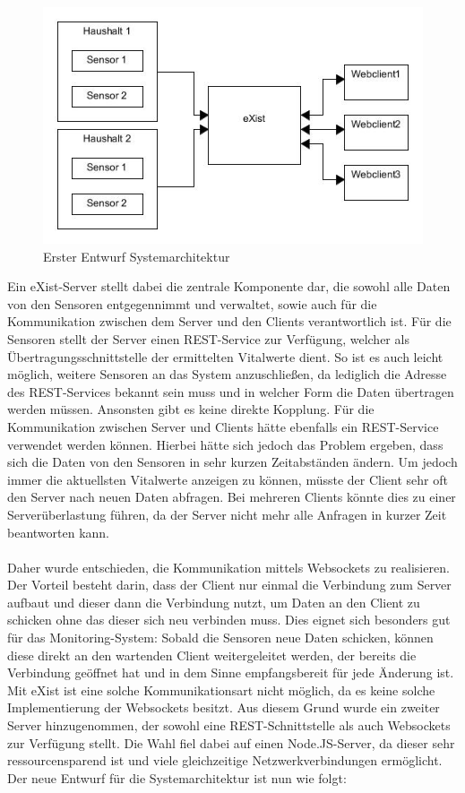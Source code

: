 \begin{figure}[h]
\begin{center}
\includegraphics[scale=0.7]{images/sa1.jpg} 
\caption{Erster Entwurf Systemarchitektur}
\end{center}
\end{figure}

Ein eXist-Server stellt dabei die zentrale Komponente dar, die sowohl alle Daten von den Sensoren entgegennimmt und verwaltet, sowie auch für die Kommunikation zwischen dem Server und den Clients verantwortlich ist. Für die Sensoren stellt der Server einen REST-Service zur Verfügung, welcher als Übertragungsschnittstelle der ermittelten Vitalwerte dient. So ist es auch leicht möglich, weitere Sensoren an das System anzuschließen, da lediglich die Adresse des REST-Services bekannt sein muss und in welcher Form die Daten übertragen werden müssen. Ansonsten gibt es keine direkte Kopplung. Für die Kommunikation zwischen Server und Clients hätte ebenfalls ein REST-Service verwendet werden können. Hierbei hätte sich jedoch das Problem ergeben, dass sich die Daten von den Sensoren in sehr kurzen Zeitabständen ändern. Um jedoch immer die aktuellsten Vitalwerte anzeigen zu können, müsste der Client sehr oft den Server nach neuen Daten abfragen. Bei mehreren Clients könnte dies zu einer Serverüberlastung führen, da der Server nicht mehr alle Anfragen in kurzer Zeit beantworten kann.
\\
\\
Daher wurde entschieden, die Kommunikation mittels Websockets zu realisieren. Der Vorteil besteht darin, dass der Client nur einmal die Verbindung zum Server aufbaut und dieser dann die Verbindung nutzt, um Daten an den Client zu schicken ohne das dieser sich neu verbinden muss. Dies eignet sich besonders gut für das Monitoring-System: Sobald die Sensoren neue Daten schicken, können diese direkt an den wartenden Client weitergeleitet werden, der bereits die Verbindung geöffnet hat und in dem Sinne empfangsbereit für jede Änderung ist. Mit eXist ist eine solche Kommunikationsart nicht möglich, da es keine solche Implementierung der Websockets besitzt. Aus diesem Grund wurde ein zweiter Server hinzugenommen, der sowohl eine REST-Schnittstelle als auch Websockets zur Verfügung stellt. Die Wahl fiel dabei auf einen Node.JS-Server, da dieser sehr ressourcensparend ist und viele gleichzeitige Netzwerkverbindungen ermöglicht. Der neue Entwurf für die Systemarchitektur ist nun wie folgt:

